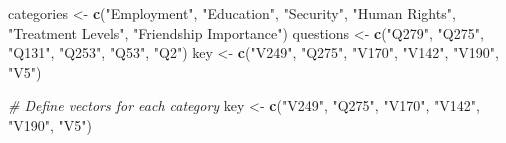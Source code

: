 \documentclass[
]{article}
\newenvironment{Shaded}{\begin{snugshade}}{\end{snugshade}}
\newcommand{\CommentTok}[1]{\textcolor[rgb]{0.56,0.35,0.01}{\textit{#1}}}
\newcommand{\FunctionTok}[1]{\textcolor[rgb]{0.13,0.29,0.53}{\textbf{#1}}}
\newcommand{\NormalTok}[1]{#1}
\newcommand{\OtherTok}[1]{\textcolor[rgb]{0.56,0.35,0.01}{#1}}
\newcommand{\StringTok}[1]{\textcolor[rgb]{0.31,0.60,0.02}{#1}}
\begin{document}
\begin{Shaded}
\begin{Highlighting}[]
\NormalTok{categories }\OtherTok{\textless{}{-}} \FunctionTok{c}\NormalTok{(}\StringTok{"Employment"}\NormalTok{, }\StringTok{"Education"}\NormalTok{, }\StringTok{"Security"}\NormalTok{, }\StringTok{"Human Rights"}\NormalTok{, }\StringTok{"Treatment Levels"}\NormalTok{, }\StringTok{"Friendship Importance"}\NormalTok{)}
\NormalTok{questions }\OtherTok{\textless{}{-}} \FunctionTok{c}\NormalTok{(}\StringTok{"Q279"}\NormalTok{, }\StringTok{"Q275"}\NormalTok{, }\StringTok{"Q131"}\NormalTok{, }\StringTok{"Q253"}\NormalTok{, }\StringTok{"Q53"}\NormalTok{, }\StringTok{"Q2"}\NormalTok{)}
\NormalTok{key }\OtherTok{\textless{}{-}} \FunctionTok{c}\NormalTok{(}\StringTok{"V249"}\NormalTok{, }\StringTok{"Q275"}\NormalTok{, }\StringTok{"V170"}\NormalTok{, }\StringTok{"V142"}\NormalTok{, }\StringTok{"V190"}\NormalTok{, }\StringTok{"V5"}\NormalTok{)}

\CommentTok{\# Define vectors for each category}
\NormalTok{key }\OtherTok{\textless{}{-}} \FunctionTok{c}\NormalTok{(}\StringTok{"V249"}\NormalTok{, }\StringTok{"Q275"}\NormalTok{, }\StringTok{"V170"}\NormalTok{, }\StringTok{"V142"}\NormalTok{, }\StringTok{"V190"}\NormalTok{, }\StringTok{"V5"}\NormalTok{)}


\end{Highlighting}
\end{Shaded}
\end{document}
